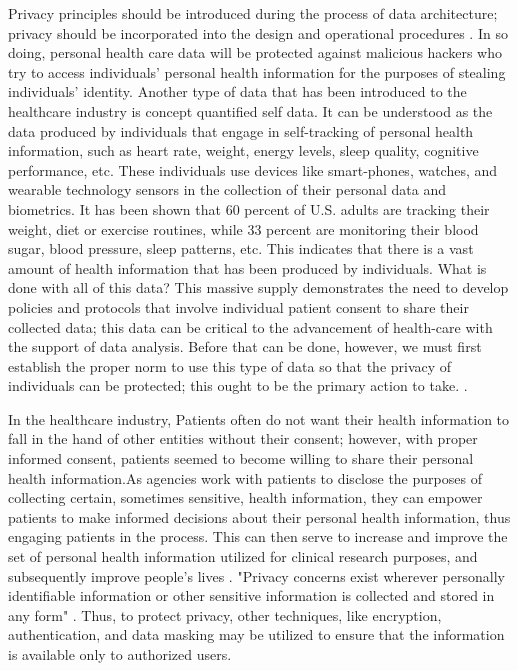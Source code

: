 \documentclass[sigconf]{acmart}
\begin{document}
Privacy principles should be introduced during the process of data architecture; privacy should be incorporated into the design and operational procedures \cite{cavoukian2012privacy}. In so doing, personal health care data will be protected against malicious hackers who try to access individuals' personal health information for the purposes of stealing individuals' identity. Another type of data that has been introduced to the healthcare industry is concept quantified self data. It can be understood as the data produced by individuals that engage in self-tracking of personal health information, such as heart rate, weight, energy levels, sleep quality, cognitive performance, etc. These individuals use devices like smart-phones, watches, and wearable technology sensors in the collection of their personal data and biometrics. It has been shown that 60 percent of U.S. adults are tracking their weight, diet or exercise routines, while 33 percent are monitoring their blood sugar, blood pressure, sleep patterns, etc. This indicates that there is a vast amount of health information that has been produced by individuals. What is done with all of this data? This massive supply demonstrates the need to develop policies and protocols that involve individual patient consent to share their collected data; this data can be critical to the advancement of health-care with the support of data analysis. Before that can be done, however, we must first establish the proper norm to use this type of data so that the privacy of individuals can be protected; this ought to be the primary action to take. \cite{swan2013quantified}.

In the healthcare industry, Patients often do not want their health information to fall in the hand of other entities without their consent; however, with proper informed consent, patients seemed to become willing to share their personal health information.As agencies work with patients to disclose the purposes of collecting certain, sometimes sensitive, health information, they can empower patients to make informed decisions about their personal health information, thus engaging patients in the process. This can then serve to increase and improve the set of personal health information utilized for clinical research purposes, and subsequently improve people's lives \cite{shelton2011electronic}. 
"Privacy concerns exist wherever personally identifiable information or other sensitive information is collected and stored in any form" \cite{khan2016digital}. Thus, to protect privacy, other techniques, like encryption, authentication, and data masking may be utilized to ensure that the information is available only to authorized users.
\end{document}
